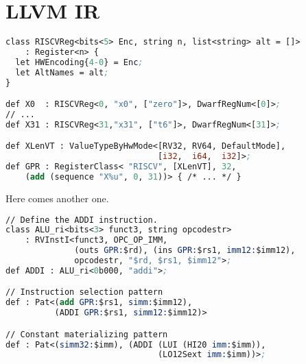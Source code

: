 \documentclass{article}
\begin{document}
\section{LLVM IR}
\begin{lstlisting}[language=llvm,style=llvm]
class RISCVReg<bits<5> Enc, string n, list<string> alt = []>
    : Register<n> {
  let HWEncoding{4-0} = Enc;
  let AltNames = alt;
}

def X0  : RISCVReg<0, "x0", ["zero"]>, DwarfRegNum<[0]>;
// ...
def X31 : RISCVReg<31,"x31", ["t6"]>, DwarfRegNum<[31]>;

def XLenVT : ValueTypeByHwMode<[RV32, RV64, DefaultMode],
                               [i32,  i64,  i32]>;
def GPR : RegisterClass< "RISCV", [XLenVT], 32, 
    (add (sequence "X%u", 0, 31))> { /* ... */ }
\end{lstlisting}

Here comes another one.
\begin{lstlisting}[language=llvm,style=llvm]
// Define the ADDI instruction.
class ALU_ri<bits<3> funct3, string opcodestr>
    : RVInstI<funct3, OPC_OP_IMM, 
              (outs GPR:$rd), (ins GPR:$rs1, imm12:$imm12),
              opcodestr, "$rd, $rs1, $imm12">;
def ADDI : ALU_ri<0b000, "addi">;

// Instruction selection pattern
def : Pat<(add GPR:$rs1, simm:$imm12), 
          (ADDI GPR:$rs1, simm12:$imm12)>

// Constant materializing pattern
def : Pat<(simm32:$imm), (ADDI (LUI (HI20 imm:$imm)),
                               (LO12Sext imm:$imm))>;
\end{lstlisting}
\end{document}
